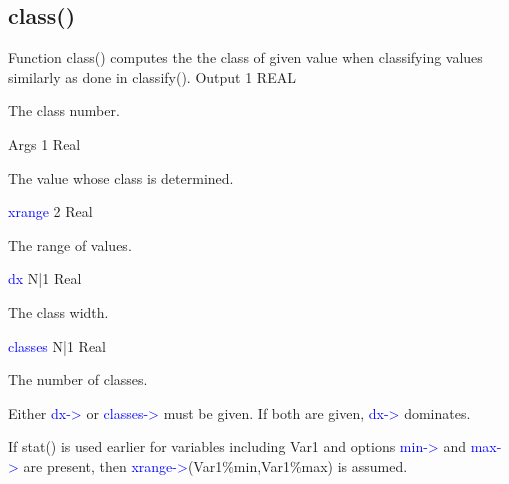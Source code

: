 \subsection{\textcolor{VioletRed}{class}()}
\label{class}
Function \textcolor{VioletRed}{class}() computes the the class of given value when classifying values
similarly as done in \textcolor{VioletRed}{classify}().
\vspace{0.3cm}
\hline
\vspace{0.3cm}
\noindent Output \tabto{3cm} 1 \tabto{5cm}  REAL \tabto{7cm}
\begin{changemargin}{3cm}{0cm}
\noindent The class number.
\end{changemargin}
\vspace{0.3cm}
\hline
\vspace{0.3cm}
\noindent Args \tabto{3cm} 1 \tabto{5cm}  Real \tabto{7cm}
\begin{changemargin}{3cm}{0cm}
\noindent The value whose class is determined.
\end{changemargin}
\vspace{0.3cm}
\hline
\vspace{0.3cm}
\noindent \textcolor{blue}{xrange} \tabto{3cm} 2 \tabto{5cm}  Real \tabto{7cm}
\begin{changemargin}{3cm}{0cm}
\noindent The range of values.
\end{changemargin}
\vspace{0.3cm}
\hline
\vspace{0.3cm}
\noindent \textcolor{blue}{dx} \tabto{3cm} N|1 \tabto{5cm}  Real \tabto{7cm}
\begin{changemargin}{3cm}{0cm}
\noindent The class width.
\end{changemargin}
\vspace{0.3cm}
\hline
\vspace{0.3cm}
\noindent \textcolor{blue}{classes} \tabto{3cm} N|1 \tabto{5cm}  Real \tabto{7cm}
\begin{changemargin}{3cm}{0cm}
\noindent The number of classes.
\end {changemargin}
\hline
\vspace{0.2cm}
\begin{note}
Either \textcolor{blue}{dx->} or \textcolor{blue}{classes->} must be given. If both are given, \textcolor{blue}{dx->} dominates.
\end{note}
\begin{note}
If \textcolor{VioletRed}{stat}() is used earlier for variables including Var1 and
options \textcolor{blue}{min->} and \textcolor{blue}{max->} are present, then
\textcolor{blue}{xrange->}(Var1\%min,Var1\%max) is assumed.
\end{note}
